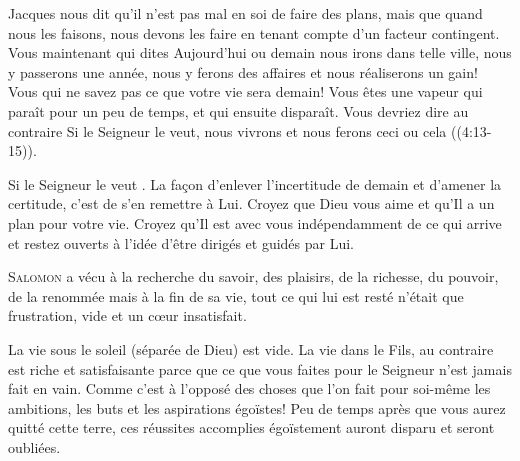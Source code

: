 
Jacques nous dit qu'il n'est pas mal en soi de faire des plans,
 mais que quand nous les faisons, nous devons les faire en tenant compte
 d'un facteur contingent.
 \Og Vous maintenant qui dites\frcolon{} Aujourd'hui ou demain nous irons
 dans telle ville, nous y passerons une année, nous y ferons des affaires
 et nous réaliserons un gain! Vous qui ne savez pas ce que votre vie
 sera demain! Vous êtes une vapeur qui paraît pour un peu de temps,
 et qui ensuite disparaît.
 Vous devriez dire au contraire\frcolon{} Si le Seigneur le veut,
 nous vivrons et nous ferons ceci ou cela \Fg{} ((4:13-15)). 

\Og Si le Seigneur le veut \Fg{}. La fa\c{c}on d'enlever l'incertitude de demain
 et d'amener la certitude, c'est de s'en remettre à Lui.
 Croyez que Dieu vous aime et qu'Il a un plan pour votre vie.
 Croyez qu'Il est avec vous indépendamment de ce qui arrive
 \ocadr et restez ouverts à l'idée d'être dirigés et guidés par Lui.

\dvrule






\lettrine{S}{alomon} a vécu à la recherche du savoir, des plaisirs,
 de la richesse, du pouvoir, de la renommée
 \ocadr mais à la fin de sa vie, tout ce qui lui est resté
 n'était que frustration, vide et un c\oe{}ur insatisfait. 

La vie sous le soleil (séparée de Dieu) est vide.
 La vie dans le Fils, au contraire est riche et satisfaisante
 parce que ce que vous faites pour le Seigneur n'est jamais fait en vain.
 Comme c'est à l'opposé des choses que l'on fait pour soi-même
 \ocadr les ambitions, les buts et les aspirations égoïstes!
 Peu de temps après que vous aurez quitté cette terre,
 ces réussites accomplies égoïstement auront disparu et seront oubliées. 

